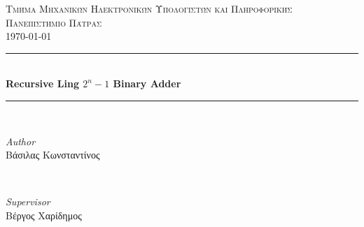 
\begin{titlepage} %
	\newcommand{\HRule}{\rule{\linewidth}{0.5mm}} %
	
	\center %
	
	
	\textsc{\LARGE Τμήμα Μηχανικών Ηλεκτρονικών Υπολογιστών και Πληροφορικής}\\[1.5cm]
	\textsc{\Large Πανεπιστήμιο Πάτρας}\\[0.5cm] 
	\textsc{\large \today}\\[0.5cm]
	
	
	\HRule\\[0.4cm]
	{\huge\bfseries Recursive Ling $2^n-1$ Binary Adder}\\[0.4cm] %
	\HRule\\[1.5cm]
	
	
	\begin{minipage}{0.4\textwidth}
		\begin{flushleft}
			\large
			\textit{Author}\\
			Βάσιλας Κωνσταντίνος %
		\end{flushleft}
	\end{minipage}
	~
	\begin{minipage}{0.4\textwidth}
		\begin{flushright}
			\large
			\textit{Supervisor}\\
			Βέργος Χαρίδημος  %
		\end{flushright}
	\end{minipage}

	 
	
	
\end{titlepage}




